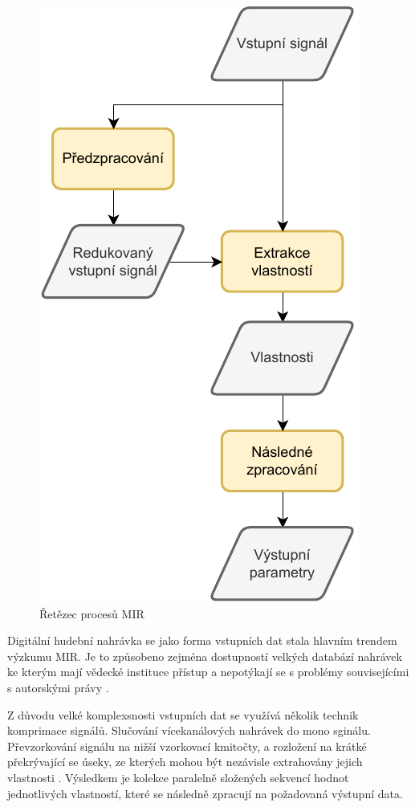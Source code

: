\begin{figure}[H]
    \centering
    \includegraphics[width = 0.4\linewidth]{obrazky/MIR-diagram.pdf}
    \caption{Řetězec procesů MIR \cite{a_new_companion_to_digital_humanities}}
    \label{fig:MIR_diagram}
\end{figure}

    Digitální hudební nahrávka se jako forma vstupních dat stala hlavním trendem výzkumu \acs{MIR}.
    Je to způsobeno zejména dostupností velkých databází nahrávek ke kterým mají vědecké instituce přístup a nepotýkají se s problémy souvisejícími s autorskými právy \cite{a_new_companion_to_digital_humanities}.

    Z důvodu velké komplexsnosti vstupních dat se využívá několik technik komprimace signálů. 
    Slučování vícekanálových nahrávek do mono sginálu. Převzorkování signálu na nižší vzorkovací kmitočty,
    a rozložení na krátké překrývající se úseky, ze kterých mohou být nezávisle extrahovány jejich vlastnosti \cite{lidy09:448[TUW-181186]}. 
    Výsledkem je kolekce paralelně složených sekvencí hodnot jednotlivých vlastností, které se následně zpracují na požadovaná výstupní data.




